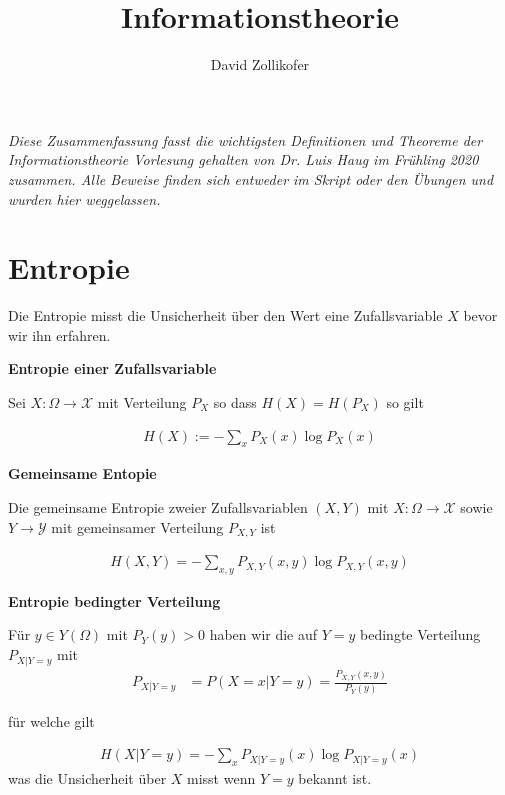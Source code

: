 \documentclass[25pt]{sciposter}
\title{\huge{Informationstheorie}}
\author{\large{David Zollikofer}}
\newenvironment{defn}[1]{\begin{mdframed}[backgroundcolor=blue!10,innertopmargin=15pt, innerbottommargin=15pt,nobreak=true]
		\textbf{#1 }
	}
	{ 
	\end{mdframed}
}
\begin{document}
\maketitle



\begin{multicols}{3}



\textit{Diese Zusammenfassung fasst die wichtigsten Definitionen und Theoreme der Informationstheorie Vorlesung gehalten von Dr. Luis Haug im Frühling 2020 zusammen. Alle Beweise finden sich entweder im Skript oder den Übungen und wurden hier weggelassen.}


\section{Entropie}


Die Entropie misst die Unsicherheit über den Wert eine Zufallsvariable $X$ bevor wir ihn erfahren.

\begin{defn}{Entropie einer Zufallsvariable}
Sei $X:\Omega \to \mathcal{X}$ mit Verteilung $P_X$ so dass $H(X) = H(P_X)$ so gilt

\begin{align*}
	H(X) := - \sum_x P_X(x) \log P_X(x)
\end{align*}
\end{defn}

\begin{defn}{Gemeinsame Entopie}
Die gemeinsame Entropie zweier Zufallsvariablen $(X,Y)$ mit $X:\Omega \to \mathcal{X}$ sowie $Y\to \mathcal{Y}$ mit gemeinsamer Verteilung $P_{X,Y}$ ist

\begin{align*}
	H(X,Y) = - \sum_{x,y} P_{X,Y} (x,y) \log P_{X,Y} (x,y)
\end{align*}
\end{defn}

\begin{defn}{Entropie bedingter Verteilung}
	Für $y\in Y(\Omega)$ mit $P_Y(y) > 0$ haben wir die auf $Y=y$ bedingte Verteilung $P_{X|Y=y}$ mit 
	\begin{align*}
		P_{X|Y=y} &= P(X=x | Y = y) = \frac{P_{X,Y}(x,y)}{P_Y(y)}
	\end{align*}
	
	für welche gilt
	
	\begin{align*}
	H(X|Y=y) = - \sum_{x} P_{X|Y=y} (x) \log P_{X|Y=y} (x)
	\end{align*}
	was die Unsicherheit über $X$ misst wenn $Y=y$ bekannt ist.
\end{defn}


\end{multicols}
\end{document}
